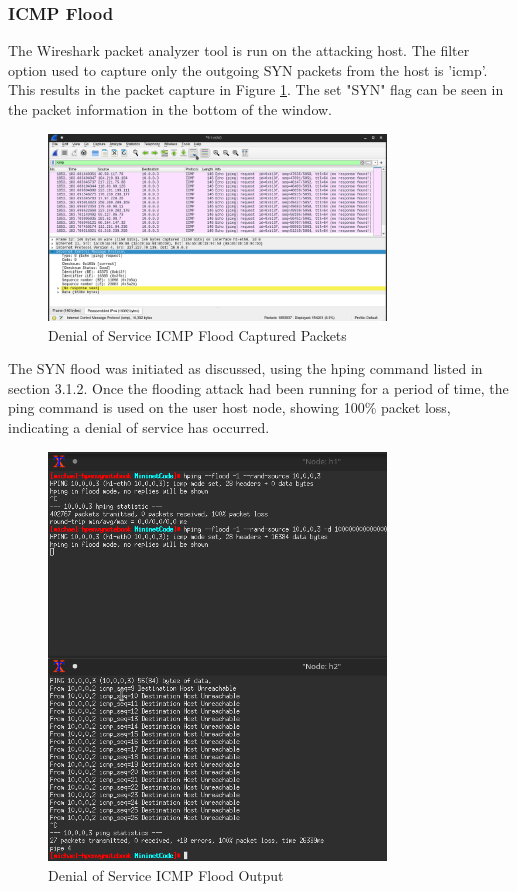 \subsubsection{ICMP Flood}

The Wireshark packet analyzer tool is run on the attacking host. The filter
option used to capture only the outgoing SYN packets from the host is
'icmp'. This results in the packet capture in Figure
\ref{fig:images-icmpFloodDosWs}. The set "SYN" flag can be seen in the packet
information in the bottom of the window.

\begin{figure}[H]
	\centering
	\includegraphics[width=0.8\textwidth]{images/icmpFloodDoSWs}
	\caption{Denial of Service ICMP Flood Captured Packets}
	\label{fig:images-icmpFloodDosWs}
\end{figure}

The SYN flood was initiated as discussed, using the hping command listed in
section 3.1.2. Once the flooding attack had been running for a period of time,
the ping command is used on the user host node, showing 100\% packet loss,
indicating a denial of service has occurred.

\begin{figure}[H]
	\centering
	\includegraphics[width=0.8\textwidth]{images/IcmpFloodDosCli}
	\caption{Denial of Service ICMP Flood Output}
	\label{fig:images-icmpFloodDosCli}
\end{figure}

